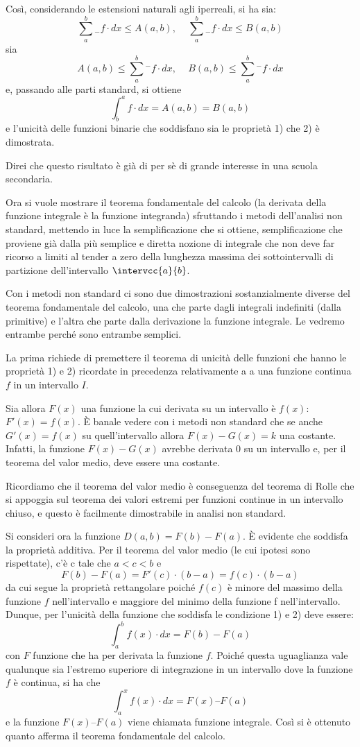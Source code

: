 Così, 
considerando le estensioni naturali agli iperreali, si ha sia:
\[\sum_a^b {}_{-}f \cdot dx \le A(a,b) \text{, } \quad
  \sum_a^b {}_{-}f \cdot dx \le B(a,b)\]
sia 
\[A(a,b) \le \sum_a^b {}^{-}f \cdot dx \text{, } \quad
  B(a,b) \le \sum_a^b {}^{-}f \cdot dx\] 
e, passando alle parti standard, si ottiene 
\[\int_b^a f \cdot dx = A(a,b) = B(a,b)\]
e l'unicità delle funzioni binarie che soddisfano sia le proprietà 1) che 2) 
è dimostrata. 

Direi che questo risultato è già di per sè di grande interesse in una scuola 
secondaria. 

Ora si vuole mostrare il teorema fondamentale del calcolo (la derivata della 
funzione integrale è la funzione integranda) sfruttando i 
metodi dell'analisi non standard, mettendo in luce la semplificazione che si 
ottiene, semplificazione che proviene già dalla più semplice e diretta 
nozione di integrale che non deve far ricorso a limiti al tender a zero della 
lunghezza massima dei sottointervalli di partizione dell'intervallo 
\(\intervcc{a}{b}\). 

Con i metodi non standard ci sono due dimostrazioni sostanzialmente diverse 
del teorema fondamentale del calcolo, una che parte dagli integrali indefiniti 
(dalla primitive) e l'altra che parte dalla derivazione la funzione integrale. 
Le vedremo entrambe perché sono entrambe semplici. 

La prima richiede di 
premettere il teorema di unicità delle funzioni che hanno le proprietà 1) e 
2) ricordate in precedenza relativamente a a una funzione continua \(f\) in 
un intervallo \(I\). 

Sia allora \(F(x)\) una funzione la cui derivata su un intervallo è 
\(f(x)\):  
\(F'(x) = f(x)\). 
È banale vedere con i metodi non standard che se anche 
\(G'(x) = f(x)\) 
su quell'intervallo allora \(F(x) - G(x) = k\) una costante. 
Infatti, la funzione 
\(F(x) - G(x)\) avrebbe derivata 0 su un intervallo e, per il teorema 
del valor medio, deve essere una costante. 

Ricordiamo che il teorema del valor medio è conseguenza del teorema
di Rolle che si appoggia sul teorema dei valori estremi per funzioni continue 
in un intervallo chiuso, e questo è facilmente dimostrabile in analisi non 
standard. 

Si consideri ora la funzione 
\(D(a,b) = F(b)-F(a)\). 
È evidente che soddisfa la proprietà additiva. Per il teorema 
del valor medio (le cui ipotesi sono rispettate), c'è c tale che 
\(a < c < b\) 
e 
\[F(b)-F(a) = F'(c)\cdot(b - a) = f(c)\cdot(b - a)\]
da cui segue la proprietà rettangolare poiché \(f(c)\) è minore del massimo 
della funzione \(f\) 
nell'intervallo e maggiore del minimo della funzione f nell'intervallo.
Dunque, 
per l'unicità della funzione che soddisfa le condizione 1) e 2) deve essere:
\[\int_a^b f(x) \cdot dx = F(b)-F(a)\]
con \(F\) funzione che ha per derivata la funzione \(f\). 
Poiché questa uguaglianza vale qualunque sia l'estremo superiore di 
integrazione in un intervallo dove la funzione \(f\) è continua, si ha che
\[\int_a^x f(x) \cdot dx = F(x) – F(a)\]
e la funzione \(F(x) – F(a)\) viene chiamata funzione integrale.
Così si è ottenuto quanto afferma il teorema fondamentale del
calcolo.

